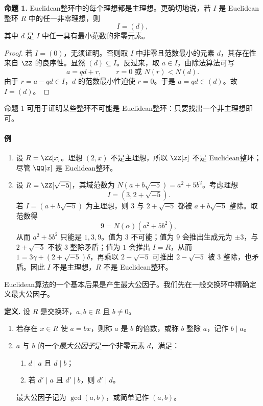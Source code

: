 \medskip
\noindent\textbf{命题 1.}
Euclidean整环中的每个理想都是主理想。更确切地说，若 $I$ 是 Euclidean整环 $R$ 中的任一非零理想，则
\[
I=(d),
\]
其中 $d$ 是 $I$ 中任一具有最小范数的非零元素。

\begin{proof}
	若 $I=(0)$，无须证明。否则取 $I$ 中非零且范数最小的元素 $d$，其存在性来自 $\ZZ$ 的良序性。显然 $(d)\subseteq I$。反过来，取 $a\in I$，由除法算法可写
	\[
	a=qd+r,
	\qquad r=0\text{ 或 }N(r)<N(d).
	\]
	由于 $r=a-qd\in I$，$d$ 的范数最小性迫使 $r=0$。于是 $a=qd\in(d)$。故 $I=(d)$。
\end{proof}

命题 1 可用于证明某些整环不可能是 Euclidean整环：只要找出一个非主理想即可。

\paragraph{例}
\begin{enumerate}[label=(\arabic*)]
	\item 设 $R=\ZZ[x]$。理想 $(2,x)$ 不是主理想，所以 $\ZZ[x]$ 不是 Euclidean整环；尽管 $\QQ[x]$ 是 Euclidean整环。
	
	\item 设 $R=\ZZ[\sqrt{-5}]$，其域范数为 $N(a+b\sqrt{-5})=a^2+5b^2$。考虑理想
	\[
	I=(3,2+\sqrt{-5}).
	\]
	若 $I=(a+b\sqrt{-5})$ 为主理想，则 $3$ 与 $2+\sqrt{-5}$ 都被 $a+b\sqrt{-5}$ 整除。取范数得
	\[
	9=N(\alpha)(a^2+5b^2),
	\]
	从而 $a^2+5b^2$ 只能是 $1,3,9$。值为 $3$ 不可能；值为 $9$ 会推出生成元为 $\pm3$，与 $2+\sqrt{-5}$ 不被 $3$ 整除矛盾；值为 $1$ 会推出 $I=R$，从而 $1=3\gamma+(2+\sqrt{-5})\delta$，再乘以 $2-\sqrt{-5}$ 可推出 $2-\sqrt{-5}$ 被 $3$ 整除，也矛盾。因此 $I$ 不是主理想，$R$ 不是 Euclidean整环。
\end{enumerate}

Euclidean算法的一个基本后果是产生最大公因子。我们先在一般交换环中精确定义最大公因子。

\noindent\textbf{定义.}
设 $R$ 是交换环，$a,b\in R$ 且 $b\neq0$。
\begin{enumerate}[label=(\arabic*)]
	\item 若存在 $x\in R$ 使 $a=bx$，则称 $a$ 是 $b$ 的倍数，或称 $b$ 整除 $a$，记作 $b\mid a$。
	\item $a$ 与 $b$ 的一个\emph{最大公因子}是一个非零元素 $d$，满足：
	\begin{enumerate}[label=(\roman*)]
		\item $d\mid a$ 且 $d\mid b$；
		\item 若 $d'\mid a$ 且 $d'\mid b$，则 $d'\mid d$。
	\end{enumerate}
	最大公因子记为 $\gcd(a,b)$，或简单记作 $(a,b)$。
\end{enumerate}

